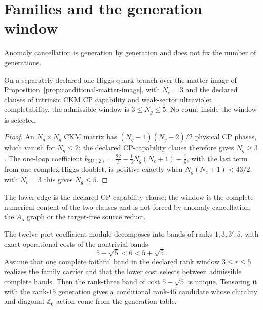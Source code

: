 \documentclass[11pt]{article}
\begin{document}
\section{Families and the generation window}
\label{sec:families}

Anomaly cancellation is generation by generation and does not fix the number
of generations.

\begin{proposition}
\label{prop:generation-window}
On a separately declared one-Higgs quark branch over the matter image of
Proposition~\ref{prop:conditional-matter-image}, with \(N_c=3\) and the
declared clauses of intrinsic CKM CP capability and weak-sector ultraviolet
completability, the admissible window is \(3\le N_g\le5\). No count inside
the window is selected.
\end{proposition}

\begin{proof}
An \(N_g\times N_g\) CKM matrix has \((N_g-1)(N_g-2)/2\) physical CP phases,
which vanish for \(N_g\le2\); the declared CP-capability clause therefore gives
\(N_g\ge3\). The one-loop coefficient
\(b_{\mathrm{SU}(2)}=\tfrac{22}{3}-\tfrac13N_g(N_c+1)-\tfrac16\), with the last
term from one complex Higgs doublet, is positive exactly when
\(N_g(N_c+1)<43/2\); with \(N_c=3\) this gives \(N_g\le5\).
\end{proof}

The lower edge is the declared CP-capability clause; the window is the
complete numerical content of the two clauses and is not forced by anomaly
cancellation, the \(A_5\) graph or the target-free source reduct.

\begin{proposition}
\label{prop:band-selection}
The twelve-port coefficient module decomposes into bands of ranks
\(1,3,3',5\), with exact operational costs of the nontrivial bands
\[
5-\sqrt5<6<5+\sqrt5.
\]
Assume that one complete faithful band in the declared rank window
\(3\le r\le5\) realizes the family carrier and that the lower cost selects
between admissible complete bands. Then the rank-three band of cost
\(5-\sqrt5\) is unique. Tensoring it with the rank-\(15\) generation gives a
conditional rank-\(45\) candidate whose chirality and diagonal \(\mathbb Z_6\)
action come from the generation table.
\end{proposition}
\end{document}
